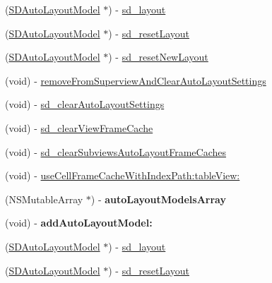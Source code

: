 \begin{DoxyCompactItemize}
(\mbox{\hyperlink{interface_s_d_auto_layout_model}{S\+D\+Auto\+Layout\+Model}} $\ast$) -\/ \mbox{\hyperlink{category_u_i_view_07_s_d_auto_layout_08_a0ecc61dfaf882906162e457bb2a5cfda}{sd\+\_\+layout}}
\item 
(\mbox{\hyperlink{interface_s_d_auto_layout_model}{S\+D\+Auto\+Layout\+Model}} $\ast$) -\/ \mbox{\hyperlink{category_u_i_view_07_s_d_auto_layout_08_a201cefc7d62e11f11f68ef12a2c499f6}{sd\+\_\+reset\+Layout}}
\item 
(\mbox{\hyperlink{interface_s_d_auto_layout_model}{S\+D\+Auto\+Layout\+Model}} $\ast$) -\/ \mbox{\hyperlink{category_u_i_view_07_s_d_auto_layout_08_a153c9536a475a6ea852e56f7bec9c4a9}{sd\+\_\+reset\+New\+Layout}}
\item 
(void) -\/ \mbox{\hyperlink{category_u_i_view_07_s_d_auto_layout_08_a0fb22a4dd54ef8a7be1a1e8e2f92787c}{remove\+From\+Superview\+And\+Clear\+Auto\+Layout\+Settings}}
\item 
(void) -\/ \mbox{\hyperlink{category_u_i_view_07_s_d_auto_layout_08_a0604c0bd6005c65aa163f700b8aec8d5}{sd\+\_\+clear\+Auto\+Layout\+Settings}}
\item 
(void) -\/ \mbox{\hyperlink{category_u_i_view_07_s_d_auto_layout_08_a52903f3c5267dfa7a517313f8ccf3ac4}{sd\+\_\+clear\+View\+Frame\+Cache}}
\item 
(void) -\/ \mbox{\hyperlink{category_u_i_view_07_s_d_auto_layout_08_afe494804af352201760acbd3226c6e54}{sd\+\_\+clear\+Subviews\+Auto\+Layout\+Frame\+Caches}}
\item 
(void) -\/ \mbox{\hyperlink{category_u_i_view_07_s_d_auto_layout_08_a50e23f4176d2c7be1acae226cdc58703}{use\+Cell\+Frame\+Cache\+With\+Index\+Path\+:table\+View\+:}}
\item 
\mbox{\label{category_u_i_view_07_s_d_auto_layout_08_a90d0de936dd3269d3fd3ed68051966ab}} 
(N\+S\+Mutable\+Array $\ast$) -\/ {\bfseries auto\+Layout\+Models\+Array}
\item 
\mbox{\label{category_u_i_view_07_s_d_auto_layout_08_aa41bfa2f4eef474014957d05c9b5b728}} 
(void) -\/ {\bfseries add\+Auto\+Layout\+Model\+:}
\item 
(\mbox{\hyperlink{interface_s_d_auto_layout_model}{S\+D\+Auto\+Layout\+Model}} $\ast$) -\/ \mbox{\hyperlink{category_u_i_view_07_s_d_auto_layout_08_a0ecc61dfaf882906162e457bb2a5cfda}{sd\+\_\+layout}}
\item 
(\mbox{\hyperlink{interface_s_d_auto_layout_model}{S\+D\+Auto\+Layout\+Model}} $\ast$) -\/ \mbox{\hyperlink{category_u_i_view_07_s_d_auto_layout_08_a201cefc7d62e11f11f68ef12a2c499f6}{sd\+\_\+reset\+Layout}}

\end{DoxyCompactItemize}
